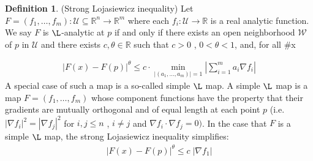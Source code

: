 \documentclass[12pt]{article}
\theoremstyle{definition}
\newtheorem{definition}{Definition}[section]
\numberwithin{equation}{subsection}
\begin{document}
\begin{definition}
(Strong Lojasiewicz inequality) Let $F = (f_1, \dots, f_m) : \mathcal{U} \subseteq \mathbb{R}^n \rightarrow \mathbb{R}^m $ where each $f_i: \mathcal{U} \rightarrow \mathbb{R}$ is a real analytic function. We say $F$ is $\L$-analytic at $p$ if and only if there exists an open neighborhood $\mathcal{W}$ of $p$ in $\mathcal{U}$ and there exists $c , \theta \in \mathbb{R}$ such that $c > 0$ , $0 < \theta < 1$, and, for all #x \in {}
\end{definition}
\begin{align}
    | F(x) - F(p)|^\theta \leq c \cdot \min_{|(a_1 , \dots, a_m)|=1}\left|\sum_{i=1}^m
 a_i \nabla f_i \right|
\end{align}
A special case of such a map is a so-called simple $\L$ map. A simple $\L$ map is a map $F = (f_1 , \dots , f_m)$ whose component functions  have the property that their gradients are mutually orthogonal and of equal length at each point $p$ (i.e. $|\nabla f_i|^2 =|\nabla f_j|^2 $ for $i , j \leq n$ , $i \neq j$ and $\nabla f_i \cdot \nabla f_j = 0)$. In the case that $F$ is a simple $\L$ map, the strong Lojasiewicz inequality simplifies:
\begin{align}
    | F(x) - F(p)|^\theta \leq c \;| \nabla f_1 |
\end{align}

\printbibliography[
heading=bibintoc,
title={References}
]
\end{document}
